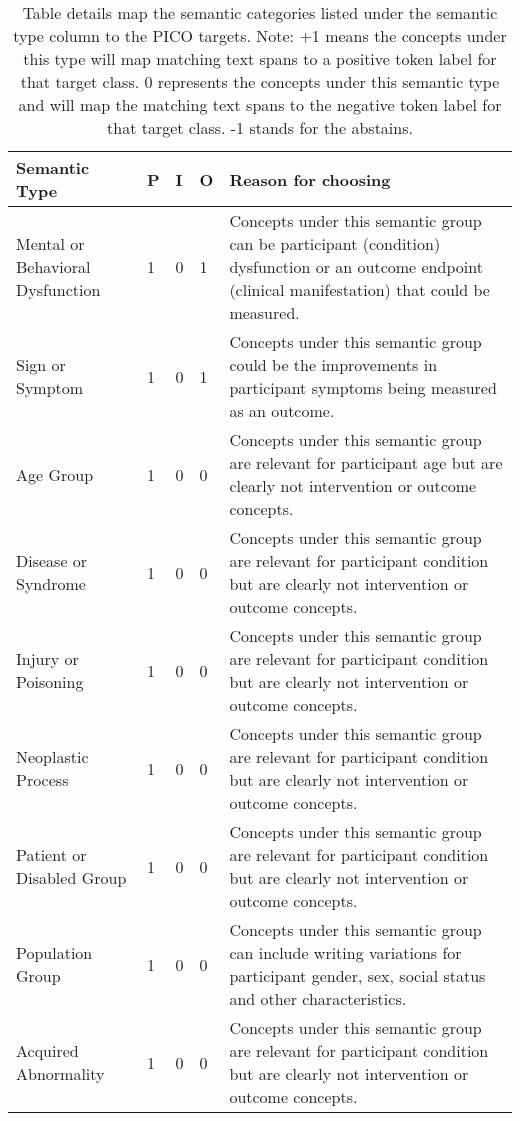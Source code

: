 \documentclass[10.7pt,]{article}
\begin{document}
\begin{longtable}{|l|p{0.3cm}|p{0.3cm}|p{0.3cm}|p{7.9cm}|}
    \caption{Table details map the semantic categories listed under the semantic type column to the PICO targets. Note: +1 means the concepts under this type will map matching text spans to a positive token label for that target class. 0 represents the concepts under this semantic type and will map the matching text spans to the negative token label for that target class. -1 stands for the abstains.}
    \label{tab:source2target}
    \endfirsthead
    \endhead
    \hline
        Semantic Type & P & I & O & Reason for choosing \\ \hline
        Mental or Behavioral Dysfunction & 1 & 0 & 1 & Concepts under this semantic group can be participant (condition) dysfunction or an outcome endpoint (clinical manifestation) that could be measured. \\ \hline
        Sign or Symptom & 1 & 0 & 1 & Concepts under this semantic group could be the improvements in participant symptoms being measured as an outcome. \\ \hline
        Age Group & 1 & 0 & 0 & Concepts under this semantic group are relevant for participant age but are clearly not intervention or outcome concepts. \\ \hline
        Disease or Syndrome & 1 & 0 & 0 & Concepts under this semantic group are relevant for participant condition but are clearly not intervention or outcome concepts. \\ \hline
        Injury or Poisoning & 1 & 0 & 0 & Concepts under this semantic group are relevant for participant condition but are clearly not intervention or outcome concepts. \\ \hline
        Neoplastic Process & 1 & 0 & 0 & Concepts under this semantic group are relevant for participant condition but are clearly not intervention or outcome concepts. \\ \hline
        Patient or Disabled Group & 1 & 0 & 0 & Concepts under this semantic group are relevant for participant condition but are clearly not intervention or outcome concepts. \\ \hline
        Population Group & 1 & 0 & 0 & Concepts under this semantic group can include writing variations for participant gender, sex, social status and other characteristics. \\ \hline
        Acquired Abnormality & 1 & 0 & 0 & Concepts under this semantic group are relevant for participant condition but are clearly not intervention or outcome concepts. \\ \hline

\end{longtable}
\end{document}
